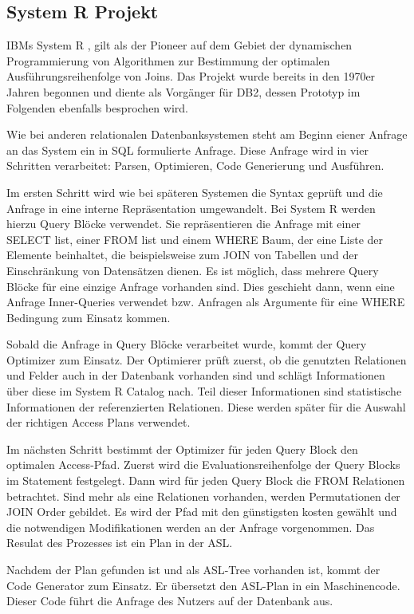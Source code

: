 \subsection{System R Projekt}

IBMs System R \cite{selinger1979access}, \cite{wade2012ibm} gilt als der Pioneer auf dem Gebiet der dynamischen Programmierung von Algorithmen zur Bestimmung der optimalen Ausführungsreihenfolge von Joins. Das Projekt wurde bereits in den 1970er Jahren begonnen und diente als Vorgänger für DB2, dessen Prototyp im Folgenden ebenfalls besprochen wird.

Wie bei anderen relationalen Datenbanksystemen steht am Beginn eiener Anfrage an das System ein in \ac{SQL} formulierte Anfrage. Diese Anfrage wird in vier Schritten verarbeitet: Parsen,  Optimieren, Code Generierung und Ausführen.

Im ersten Schritt wird wie bei späteren Systemen die Syntax geprüft und die Anfrage in eine interne Repräsentation umgewandelt. Bei System R werden hierzu Query Blöcke verwendet. Sie repräsentieren die Anfrage mit einer SELECT list, einer FROM list und einem WHERE Baum, der eine Liste der Elemente beinhaltet, die beispielsweise zum JOIN von Tabellen und der Einschränkung von Datensätzen dienen. Es ist möglich, dass mehrere Query Blöcke für eine einzige Anfrage vorhanden sind. Dies geschieht dann, wenn eine Anfrage Inner-Queries verwendet bzw. Anfragen als Argumente für eine WHERE Bedingung zum Einsatz kommen.


Sobald die Anfrage in Query Blöcke verarbeitet wurde, kommt der Query Optimizer zum Einsatz. Der Optimierer prüft zuerst, ob die genutzten Relationen und Felder auch in der Datenbank vorhanden sind und schlägt Informationen über diese im System R Catalog nach. Teil dieser Informationen sind statistische Informationen der referenzierten Relationen. Diese werden später für die Auswahl der richtigen Access Plans verwendet.

Im nächsten Schritt bestimmt der Optimizer für jeden Query Block den optimalen Access-Pfad. Zuerst wird die Evaluationsreihenfolge der Query Blocks im Statement festgelegt. Dann wird für jeden Query Block die FROM Relationen betrachtet. Sind mehr als eine Relationen vorhanden, werden Permutationen der JOIN Order gebildet. Es wird der Pfad mit den günstigsten kosten gewählt und die notwendigen Modifikationen werden an der Anfrage vorgenommen. Das Resulat des Prozesses ist ein Plan in der \ac{ASL}.

Nachdem der Plan gefunden ist und als \ac{ASL}-Tree vorhanden ist, kommt der Code Generator zum Einsatz. Er übersetzt den \ac{ASL}-Plan in ein Maschinencode. Dieser Code führt die Anfrage des Nutzers auf der Datenbank aus. 


